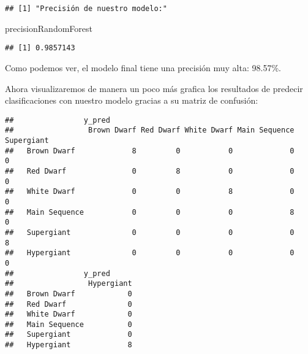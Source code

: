 \documentclass[
]{article}
\newenvironment{Shaded}{\begin{snugshade}}{\end{snugshade}}
\newcommand{\AttributeTok}[1]{\textcolor[rgb]{0.80,0.80,0.80}{#1}}
\newcommand{\DecValTok}[1]{\textcolor[rgb]{0.86,0.86,0.80}{#1}}
\newcommand{\FunctionTok}[1]{\textcolor[rgb]{0.94,0.94,0.56}{#1}}
\newcommand{\NormalTok}[1]{\textcolor[rgb]{0.80,0.80,0.80}{#1}}
\newcommand{\OtherTok}[1]{\textcolor[rgb]{0.94,0.94,0.56}{#1}}
\newcommand{\SpecialCharTok}[1]{\textcolor[rgb]{0.86,0.64,0.64}{#1}}
\begin{document}
\begin{verbatim}
## [1] "Precisión de nuestro modelo:"
\end{verbatim}

\begin{Shaded}
\begin{Highlighting}[]
\NormalTok{precisionRandomForest}
\end{Highlighting}
\end{Shaded}

\begin{verbatim}
## [1] 0.9857143
\end{verbatim}

Como podemos ver, el modelo final tiene una precisión muy alta: 98.57\%.

Ahora visualizaremos de manera un poco más grafica los resultados de
predecir clasificaciones con nuestro modelo gracias a su matriz de
confusión:

\begin{Shaded}
\end{Shaded}

\begin{verbatim}
##                y_pred
##                 Brown Dwarf Red Dwarf White Dwarf Main Sequence Supergiant
##   Brown Dwarf             8         0           0             0          0
##   Red Dwarf               0         8           0             0          0
##   White Dwarf             0         0           8             0          0
##   Main Sequence           0         0           0             8          0
##   Supergiant              0         0           0             0          8
##   Hypergiant              0         0           0             0          0
##                y_pred
##                 Hypergiant
##   Brown Dwarf            0
##   Red Dwarf              0
##   White Dwarf            0
##   Main Sequence          0
##   Supergiant             0
##   Hypergiant             8
\end{verbatim}
\end{document}
